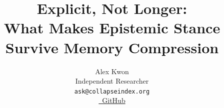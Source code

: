 \documentclass[11pt]{article}
\title{Explicit, Not Longer:\\
What Makes Epistemic Stance Survive Memory Compression}
\author{
  Alex Kwon \\
  Independent Researcher \\
  \texttt{ask@collapseindex.org} \\[4pt]
  \href{https://github.com/collapseindex/factwash}{\faGithub~GitHub}
}
\begin{document}
\raggedbottom
\maketitle

\end{document}

